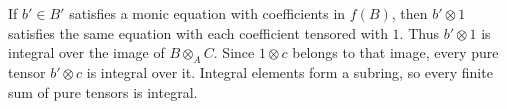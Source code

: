 If $b'\in B'$ satisfies a monic equation with coefficients in $f(B)$, then $b'\otimes1$ satisfies the same equation with each coefficient tensored with $1$. Thus $b'\otimes1$ is integral over the image of $B\otimes_A C$. Since $1\otimes c$ belongs to that image, every pure tensor $b'\otimes c$ is integral over it. Integral elements form a subring, so every finite sum of pure tensors is integral.
